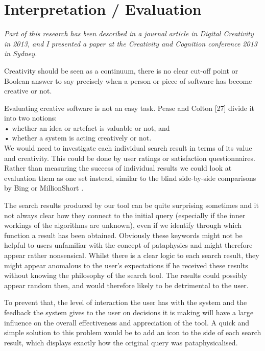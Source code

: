 
\chapter{Interpretation / Evaluation}
\label{ch:interpretation}

\emph{Part of this research has been described in a journal article in Digital Creativity in 2013, and I presented a paper at the Creativity and Cognition conference 2013 in Sydney.}

\grule

Creativity should be seen as a continuum, there is no clear cut-off point or Boolean answer to say precisely when a person or piece of software has become creative or not.

Evaluating creative software is not an easy task. Pease and Colton [27] divide it into two notions: \\
•	whether an idea or artefact is valuable or not, and\\
•	whether a system is acting creatively or not.\\
We would need to investigate each individual search result in terms of its value and creativity. This could be done by user ratings or satisfaction questionnaires. Rather than measuring the success of individual results we could look at evaluation them as one set instead, similar to the blind side-by-side comparisons by Bing or MillionShort .

The search results produced by our tool can be quite surprising sometimes and it not always clear how they connect to the initial query (especially if the inner workings of the algorithms are unknown), even if we identify through which function a result has been obtained. Obviously these keywords might not be helpful to users unfamiliar with the concept of pataphysics and might therefore appear rather nonsensical. Whilst there is a clear logic to each search result, they might appear anomalous to the user’s expectations if he received these results without knowing the philosophy of the search tool. The results could possibly appear random then, and would therefore likely to be detrimental to the user.

To prevent that, the level of interaction the user has with the system and the feedback the system gives to the user on decisions it is making will have a large influence on the overall effectiveness and appreciation of the tool. A quick and simple solution to this problem would be to add an icon to the side of each search result, which displays exactly how the original query was pataphysicalised.

